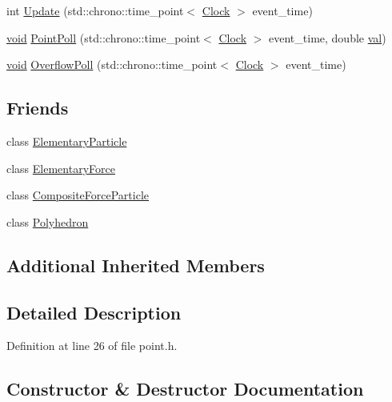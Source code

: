 \begin{DoxyCompactItemize}
\item 
int \mbox{\hyperlink{class_point_a7ad2d1933410012c59bffbd4ac611279}{Update}} (std\+::chrono\+::time\+\_\+point$<$ \mbox{\hyperlink{universe_8h_a0ef8d951d1ca5ab3cfaf7ab4c7a6fd80}{Clock}} $>$ event\+\_\+time)
\item 
\mbox{\hyperlink{glad_8h_a950fc91edb4504f62f1c577bf4727c29}{void}} \mbox{\hyperlink{class_point_a026fcbc22b4667e74fea48a9dc6eeb61}{Point\+Poll}} (std\+::chrono\+::time\+\_\+point$<$ \mbox{\hyperlink{universe_8h_a0ef8d951d1ca5ab3cfaf7ab4c7a6fd80}{Clock}} $>$ event\+\_\+time, double \mbox{\hyperlink{glad_8h_a26942fd2ed566ef553eae82d2c109c8f}{val}})
\item 
\mbox{\hyperlink{glad_8h_a950fc91edb4504f62f1c577bf4727c29}{void}} \mbox{\hyperlink{class_point_a44c69c43cfdcb3273d0e6786a21fd000}{Overflow\+Poll}} (std\+::chrono\+::time\+\_\+point$<$ \mbox{\hyperlink{universe_8h_a0ef8d951d1ca5ab3cfaf7ab4c7a6fd80}{Clock}} $>$ event\+\_\+time)
\end{DoxyCompactItemize}
\subsection*{Friends}
\begin{DoxyCompactItemize}
\item 
class \mbox{\hyperlink{class_point_af2ace341c1d7ccd30de3502502773591}{Elementary\+Particle}}
\item 
class \mbox{\hyperlink{class_point_a6e57500586e9cd366f5cf76ea0299957}{Elementary\+Force}}
\item 
class \mbox{\hyperlink{class_point_a9bc6eb2a4c20ce83728a7c9a31b91f19}{Composite\+Force\+Particle}}
\item 
class \mbox{\hyperlink{class_point_a28d1b9582890ca3e2b61dafdc1c3ba84}{Polyhedron}}
\end{DoxyCompactItemize}
\subsection*{Additional Inherited Members}


\subsection{Detailed Description}


Definition at line 26 of file point.\+h.



\subsection{Constructor \& Destructor Documentation}
\mbox{\label{class_point_ad92f2337b839a94ce97dcdb439b4325a}} 
